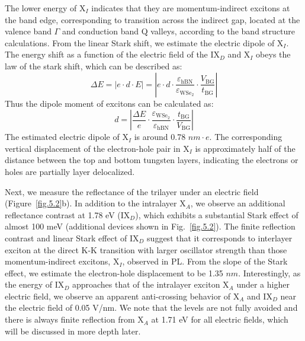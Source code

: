 The lower energy of X$_I$ indicates that they are momentum-indirect excitons at the band edge, corresponding to transition across the indirect gap, located at the valence band $\Gamma$ and conduction band Q valleys, according to the band structure calculations\cite{Wang2018-pz,Scuri2020-fd,Movva2018-mu}. 
From the linear Stark shift, we estimate the electric dipole of X$_I$.  
The energy shift as a function of the electric field of the IX$_D$ and X$_I$ obeys the law of the stark shift, which can be described as:
\begin{equation}
\Delta E = \lvert e \cdot d \cdot E \rvert 
= \left\lvert e \cdot d \cdot \frac{\varepsilon_{\mathrm{hBN}}}{\varepsilon_{\mathrm{WSe_2}}}
\cdot \frac{V_{\mathrm{BG}}}{t_{\mathrm{BG}}} \right\rvert 
\label{eq:deltaE}
\end{equation}
Thus the dipole moment of excitons can be calculated as:
\begin{equation}
d = \left\lvert 
\frac{\Delta E}{e} \cdot 
\frac{\varepsilon_{\mathrm{WSe_2}}}{\varepsilon_{\mathrm{hBN}}} \cdot 
\frac{t_{\mathrm{BG}}}{V_{\mathrm{BG}}} 
\right\rvert
\label{eq:d_expression}
\end{equation}
The estimated electric dipole of X$_I$ is around 0.78 $nm\cdot e$. 
The corresponding vertical displacement of the electron-hole pair in X$_I$ is approximately half of the distance between the top and bottom tungsten layers, indicating the electrons or holes are partially layer delocalized. 

Next, we measure the reflectance of the trilayer under an electric field (Figure~\ref{fig.5.2}b). 
In addition to the intralayer X$_A$, we observe an additional reflectance contrast at 1.78 eV (IX$_D$), which exhibits a substantial Stark effect of almost 100 meV (additional devices shown in Fig.~\ref{fig.5.2}). 
The finite reflection contrast and linear Stark effect of IX$_D$ suggest that it corresponds to interlayer exciton at the direct K-K transition with larger oscillator strength than those momentum-indirect excitons, X$_I$, observed in PL.
From the slope of the Stark effect, we estimate the electron-hole displacement to be 1.35 $nm$. 
Interestingly, as the energy of IX$_D$ approaches that of the intralayer exciton X$_A$ under a higher electric field, we observe an apparent anti-crossing behavior of X$_A$ and IX$_D$ near the electric field of 0.05 V/nm. 
We note that the levels are not fully avoided and there is always finite reflection from X$_A$ at 1.71 eV for all electric fields, which will be discussed in more depth later. 

